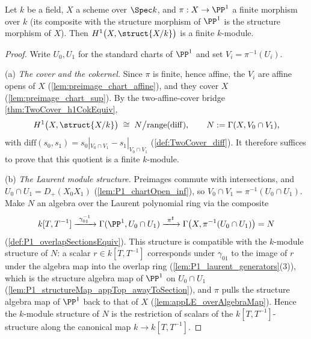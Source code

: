 \begin{theorem}
  \label{thm:moduleFinite_hModule_one_of_isFinite_toP1}
  \leanok
  Let \(k\) be a field, \(X\) a scheme over \(\Spec k\), and \(\pi : X \to \PP^1\) a
  finite morphism over \(k\) (its composite with the structure morphism of \(\PP^1\) is
  the structure morphism of \(X\)). Then \(H^1\bigl(X, \struct{X/k}\bigr)\) is a finite
  \(k\)-module.
\end{theorem}
\begin{proof}
  \leanok
  Write \(U_0, U_1\) for the standard charts of \(\PP^1\) and set
  \(V_i = \pi^{-1}(U_i)\).

  (a) \emph{The cover and the cokernel.} Since \(\pi\) is finite, hence affine, the
  \(V_i\) are affine opens of \(X\) (\ref{lem:preimage_chart_affine}), and they cover
  \(X\) (\ref{lem:preimage_chart_sup}). By the two-affine-cover bridge
  \ref{thm:TwoCover_h1CokEquiv},
  \[
    H^1\bigl(X, \struct{X/k}\bigr) \;\cong\;
      N \big/ \mathrm{range}(\mathrm{diff}),
    \qquad N := \Gamma(X, V_0 \cap V_1),
  \]
  with \(\mathrm{diff}(s_0, s_1) = s_0|_{V_0 \cap V_1} - s_1|_{V_0 \cap V_1}\)
  (\ref{def:TwoCover_diff}). It therefore suffices to prove that this quotient is a
  finite \(k\)-module.

  (b) \emph{The Laurent module structure.} Preimages commute with intersections, and
  \(U_0 \cap U_1 = D_+(X_0X_1)\) (\ref{lem:P1_chartOpen_inf}), so
  \(V_0 \cap V_1 = \pi^{-1}(U_0 \cap U_1)\). Make \(N\) an algebra over the Laurent
  polynomial ring via the composite
  \[
    k[T, T^{-1}] \xrightarrow{\ \gamma_{01}^{-1}\ } \Gamma(\PP^1, U_0 \cap U_1)
      \xrightarrow{\ \pi^\sharp\ } \Gamma\bigl(X, \pi^{-1}(U_0 \cap U_1)\bigr) = N
  \]
  (\ref{def:P1_overlapSectionsEquiv}). This structure is compatible with the \(k\)-module
  structure of \(N\): a scalar \(r \in k[T,T^{-1}]\) corresponds under \(\gamma_{01}\) to
  the image of \(r\) under the algebra map into the overlap ring
  (\ref{lem:P1_laurent_generators}(3)), which is the structure algebra map of \(\PP^1\)
  on \(U_0 \cap U_1\) (\ref{lem:P1_structureMap_appTop_awayToSection}), and \(\pi\) pulls
  the structure algebra map of \(\PP^1\) back to that of \(X\)
  (\ref{lem:appLE_overAlgebraMap}). Hence the \(k\)-module structure of \(N\) is the
  restriction of scalars of the \(k[T,T^{-1}]\)-structure along the canonical map
  \(k \to k[T,T^{-1}]\).


\end{proof}
